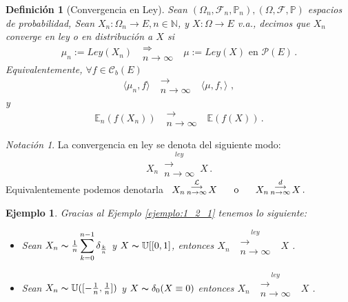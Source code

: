 \documentclass[letterpaper,11pt]{article} %
\def\espacio{\hspace{.25cm}\,}
\theoremstyle{defbreak}
\newtheorem{definition}{Definición}[subsection]
\newtheorem{example}{Ejemplo}[subsection]
\theoremstyle{propbreak}
\theoremstyle{remark}
\newtheorem*{notation}{Notación}
\theoremstyle{break}
\begin{document}
\begin{definition}[Convergencia en Ley]
Sean $(\Omega_n,\mathcal{F}_n,\mathbb{P}_n), (\Omega,\mathcal{F},\mathbb{P})$ espacios de probabilidad, Sean $X_n:\Omega_n \longrightarrow E, n\in\mathbb{N}$, y $X:\Omega \longrightarrow E$ v.a., decimos que $X_n$ converge en ley o en distribución a $X$ si 
$$\mu_n:=Ley(X_n) \mbox{ }\substack{\Longrightarrow \\n \to \infty}\mbox{ } \mu:=Ley(X)\mbox{ en }\mathcal{P}(E) \, .$$
Equivalentemente, $\forall f \in \mathcal{C}_b(E)$ $$ \langle \mu_n,f \rangle \mbox{ }\substack{\longrightarrow \\ n\to\infty}\mbox{ } \langle \mu,f,\rangle\, \, ,$$
y 
$$ \mathbb{E}_n(f(X_n)) \mbox{ }\substack{\longrightarrow \\ n\to\infty}\mbox{ } \mathbb{E}(f(X))\, .$$
\end{definition}
\begin{notation}
La convergencia en ley se denota del siguiente modo:
$$X_n \,\overset{ley}{\substack{\longrightarrow \\n \to \infty}}\,X \, .$$
Equivalentemente podemos denotarla \espacio
$ X_n \,\overset{\mathcal{L}}{\substack{\longrightarrow \\n \to \infty}}\,X \hspace{.5cm}\mbox{ o }\hspace{.5cm} X_n\,\overset{d}{\substack{\longrightarrow \\n \to \infty}}\,X \, .$
\end{notation}

\begin{example}
Gracias al Ejemplo \ref{ejemplo:1_2_1} tenemos lo siguiente:
\begin{itemize}
    \item Sean $X_n \thicksim \frac{1}{n}\displaystyle\sum_{k=0}^{n-1}\delta_{\frac{k}{n}}$ y $X \thicksim \mathbb{U}[[0,1]$, entonces $X_n \mbox{ }\overset{ley}{\substack{\longrightarrow \\n \to \infty}}\mbox{ }X$ .
    \item Sean $X_n \thicksim \mathbb{U}([-\frac{1}{n},\frac{1}{n}])$ y $X \thicksim \delta_0 (X \equiv 0)$ entonces $X_n\mbox{ }\overset{ley}{\substack{\longrightarrow \\n \to \infty}}\mbox{ }X$ .
\end{itemize}
\end{example}
\end{document}
